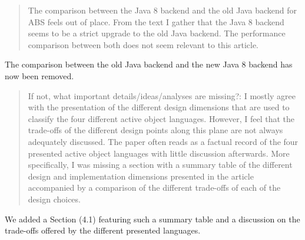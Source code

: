 \documentclass{article}
\begin{document}
\begin{quote}
 The comparison between the Java 8 backend and the old Java backend 
for ABS feels out of place. From the text I gather that the Java 8 backend seems to be a 
strict upgrade to the old Java backend. The performance comparison between both does not 
seem relevant to this article.
\end{quote}
The comparison between the old Java backend and the new Java 8 backend has now been 
removed.

\begin{quote}
	If not, what important details/ideas/analyses are missing?: I mostly agree with the 
presentation of the different design dimensions that are used to classify the four 
different active object languages. However, I feel that the trade-offs of the different 
design points along this plane are not always adequately discussed. The paper often reads 
as a factual record of the four presented active object languages with little discussion 
afterwards. More specifically, I was missing a section with a summary table of the 
different design and implementation dimensions presented in the article accompanied by a 
comparison of the different trade-offs of each of the design choices.
\end{quote}
We added a Section (4.1) featuring such a summary table and a discussion on the 
trade-offs offered by the different presented languages.
\end{document}
